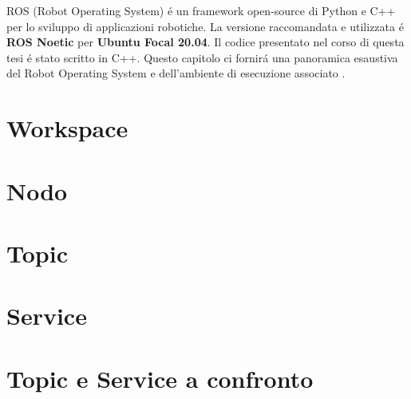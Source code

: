 ROS (Robot Operating System) \'{e} un framework open-source di Python e C++ per lo sviluppo di applicazioni robotiche.
La versione raccomandata e utilizzata \'{e} \textbf{ROS Noetic} per \textbf{Ubuntu Focal 20.04}. 
Il codice presentato nel corso di questa tesi \'{e} stato scritto in C++.
Questo capitolo ci fornir\'{a} una panoramica esaustiva del Robot Operating System e dell'ambiente di esecuzione associato 
\cite{ros}.

\section{Workspace}


\section{Nodo}


\section{Topic}


\section{Service}


\section{Topic e Service a confronto}
